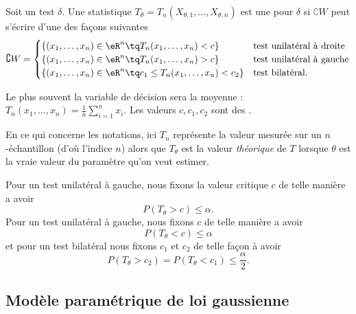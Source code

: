 Soit un test \( \delta\). Une statistique \( T_{\theta}=T_n(X_{\theta,1},\ldots,X_{\theta,n})\) est une  pour \( \delta\) si \( \complement W\) peut s'écrire d'une des façons suivantes
\begin{equation}
	\complement W=\begin{cases}
		\{ (x_1,\ldots,x_n)\in\eR^n\tq T_n(x_1,\ldots,x_n)<c \}           & \text{test unilatéral à droite} \\
		\{ (x_1,\ldots,x_n)\in\eR^n\tq T_n(x_1,\ldots,x_n)>c \}           & \text{test unilatéral à gauche} \\
		\{ (x_1,\ldots,x_n)\in\eR^n\tq c_1\leq T_n(x_1,\ldots,x_n)<c_2 \} & \text{test bilatéral}.
	\end{cases}
\end{equation}

Le plus souvent la variable de décision sera la moyenne : \( T_n(x_1,\ldots,x_n)=\frac{1}{ n }\sum_{i=1}^nx_i\). Les valeurs \( c,c_1,c_2\) sont des .

En ce qui concerne les notations, ici \( T_n\) représente la valeur mesurée sur un \( n\)-échantillon (d'où l'indice \( n\)) alors que \( T_{\theta}\) est la valeur \emph{théorique} de \( T\) lorsque \( \theta\) est la vraie valeur du paramètre qu'on veut estimer.

Pour un test unilatéral à gauche, nous fixons la valeur critique \( c\) de telle manière a avoir
\begin{equation}
	P(T_{\theta}>c)\leq \alpha.
\end{equation}
Pour un test unilatéral à gauche, nous fixons \( c\) de telle manière a avoir
\begin{equation}
	P(T_{\theta}<c)\leq \alpha
\end{equation}
et pour un test bilatéral nous fixons \( c_1\) et \( c_2\) de telle façon à avoir
\begin{equation}
	P(T_{\theta}>c_2)=P(T_{\theta}<c_1)\leq\frac{ \alpha }{2}.
\end{equation}

\subsection{Modèle paramétrique de loi gaussienne}

